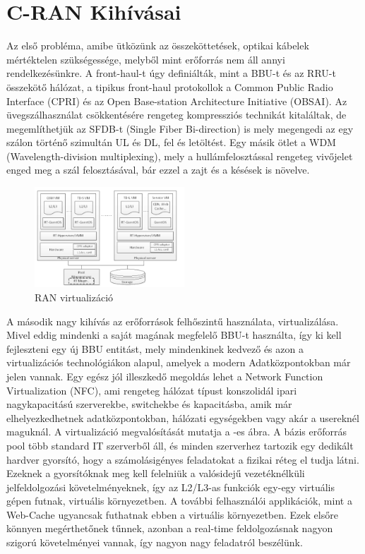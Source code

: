 \section{C-RAN Kihívásai}
\hspace{2mm}  \indent Az első probléma, amibe ütközünk az összeköttetések, optikai kábelek mértéktelen szükségessége, melyből mint erőforrás nem áll annyi rendelkezésünkre. A front-haul-t úgy definiálták, mint a BBU-t és az RRU-t összekötő hálózat, a tipikus front-haul protokollok a Common Public Radio Interface (CPRI) és az Open Base-station Architecture Initiative (OBSAI). Az üvegszálhasználat csökkentésére rengeteg kompressziós technikát kitaláltak, de megemlíthetjük az SFDB-t (Single Fiber Bi-direction) is mely megengedi az egy szálon történő szimultán UL és DL, fel és letöltést. Egy másik ötlet a WDM (Wavelength-division multiplexing), mely a hullámfelosztással rengeteg vivőjelet enged meg a szál felosztásával, bár ezzel a zajt és a késések is növelve.
\vspace{-20pt}
\begin{figure}
\captionsetup{format=plain}
\includegraphics[width=0.5\textwidth, keepaspectratio]{figures/virtualisation.png}
\caption{RAN virtualizáció}
\label{fig:virtualisation}
\vspace{-20pt}
\end{figure}

\indent A második nagy kihívás az erőforrások felhőszintű használata, virtualizálása. Mivel eddig mindenki a saját magának megfelelő BBU-t használta, így ki kell fejleszteni egy új BBU entitást, mely mindenkinek kedvező és azon a virtualizációs technológiákon alapul, amelyek a modern Adatközpontokban már jelen vannak. Egy egész jól illeszkedő megoldás lehet a Network Function Virtualization (NFC), ami rengeteg hálózat típust konszolidál ipari nagykapacitású szerverekbe, switchekbe és kapacitásba, amik már elhelyezkedhetnek adatközpontokban, hálózati egységekben vagy akár a usereknél maguknál. \cite{NFV}
A virtualizáció megvalósítását mutatja a -es ábra. A bázis erőforrás pool több standard IT szerverből áll, és minden szerverhez tartozik egy dedikált hardver gyorsító, hogy a számolásigényes feladatokat a fizikai réteg el tudja látni. Ezeknek a gyorsítóknak meg kell felelniük a valósidejű vezetéknélküli jelfeldolgozási követelményeknek, így az L2/L3-as funkciók egy-egy virtuális gépen futnak, virtuális környezetben. A további felhasználói applikációk, mint a Web-Cache ugyancsak futhatnak ebben a virtuális környezetben. Ezek elsőre könnyen megérthetőnek tűnnek, azonban a real-time feldolgozásnak nagyon szigorú követelményei vannak, így nagyon nagy feladatról beszélünk.\cite{RecentCRANProg}

